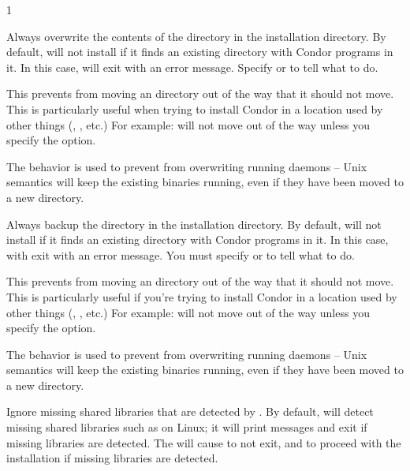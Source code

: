 \begin{ManPage}{\label{man-condor-configure}}{1}
\begin{Options}
   {
    Always overwrite the contents of the  directory in
    the installation directory.  By default, 
    will not install if it finds an existing  directory
    with Condor programs in it.  In this case, 
    will exit with an error message.  Specify
     or  to tell 
    what to do.

    This prevents  from moving an 
    directory out of the way that it should not move.  This is
    particularly useful when trying to install Condor in a
    location used by other things (, , etc.)
    For example:  
         will not move
     out of the way unless you specify the
     option.

    The  behavior is used to
    prevent  from overwriting running daemons --
    Unix semantics will keep the existing binaries running, even
    if they have been moved to a new directory.}

   {
    Always backup the  directory in the installation
    directory.  By default,  will not install if
    it finds an existing  directory with Condor programs
    in it.  In this case,  with exit with an
    error message.  You must specify  or
     to tell  what to do.

    This prevents  from moving an 
    directory out of the way that it should not move.  This is
    particularly useful if you're trying to install Condor in a
    location used by other things (, , etc.)
    For example:  
         will not move
     out of the way unless you specify the
     option.

    The  behavior is used to
    prevent  from overwriting running daemons --
    Unix semantics will keep the existing binaries running, even
    if they have been moved to a new directory.}

   {
    Ignore missing shared libraries that are detected by
    .  By default,  will detect
    missing shared libraries such as  on
    Linux; it will print messages and exit if missing libraries
    are detected.  The  will cause
     to not exit, and to proceed with the
    installation if missing libraries are detected.  }


\end{Options}
\end{ManPage}
